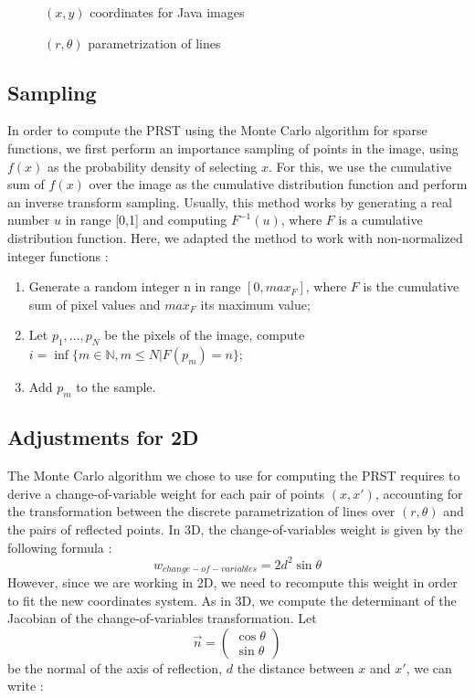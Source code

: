 \documentclass[10pt,a4paper]{article}                        %
\begin{document}
\begin{figure}[h]

\caption{$(x,y)$ coordinates for Java images}
\label{coordinates}        
\end{figure}

\begin{figure}[h]        
        
\caption{$(r,\theta)$ parametrization of lines}
\label{lines_parametrization}
\end{figure}

        \subsection{Sampling}
In order to compute the PRST using the Monte Carlo algorithm for sparse functions, we first perform an importance sampling of points in the image, using $f(x)$  as the probability density of selecting $x$. For this, we use the cumulative sum of $f(x)$ over the image as the cumulative distribution function and perform an inverse transform sampling. Usually, this method works by generating a real number $u$ in range [0,1] and computing $F^{-1}(u)$, where $F$ is a cumulative distribution function. Here, we adapted the method to work with non-normalized integer functions :
\begin{enumerate}
\item Generate a random integer n in range $[0,max_F]$, where $F$ is the cumulative sum of pixel values and $max_F$ its maximum value;
\item Let $p_1,...,p_N$ be the pixels of the image, compute $i=\inf\{m\in \mathbb{N}, m\leq N |  F(p_m) = n\}$;
\item Add $p_m$ to the sample.
\end{enumerate}



        \subsection{Adjustments for 2D}
        

The Monte Carlo algorithm we chose to use for computing the PRST requires to derive a change-of-variable weight for each pair of points $(x,x')$, accounting for the transformation between the discrete parametrization of lines over $(r,\theta)$ and the pairs of reflected points. In 3D, the change-of-variables weight is given by the following formula :
\[w_{change-of-variables} = 2d^2\sin\theta\]
However, since we are working in 2D, we need to recompute this weight in order to fit the new coordinates system. As in 3D, we compute the determinant of the Jacobian of the change-of-variables transformation. Let 
\[\vec{n}=\begin{pmatrix}\cos\theta \\ \sin\theta\end{pmatrix}\]
be the normal of the axis of reflection, $d$ the distance between $x$ and $x'$, we can write :
\end{document}
